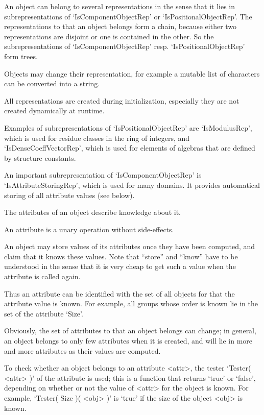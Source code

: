 An object can belong to several representations in the sense that it lies
in subrepresentations of `IsComponentObjectRep' or
`IsPositionalObjectRep'.
The representations to that an object belongs form a chain, 
because either two representations are disjoint or one is contained in
the other.
So the subrepresentations of `IsComponentObjectRep' resp.
`IsPositionalObjectRep' form trees.

Objects may change their representation,
for example a mutable list of characters can be converted into a string.

All representations are created during initialization,
especially they are not created dynamically at runtime.

Examples of subrepresentations of `IsPositionalObjectRep' are
`IsModulusRep',
which is used for residue classes in the ring of integers,
and `IsDenseCoeffVectorRep',
which is used for elements of algebras that are defined by structure
constants.

An important subrepresentation of `IsComponentObjectRep' is
`IsAttributeStoringRep', which is used for many domains.
It provides automatical storing of all attribute values (see below).


The attributes of an object describe knowledge about it.

An attribute is a unary operation without side-effects.

An object may store values of its attributes once they have been
computed, and claim that it knows these values.
Note that ``store'' and ``know'' have to be understood in the sense that 
it is very cheap to get such a value when the attribute is called again.


Thus an attribute can be identified with the set of all objects for that
the attribute value is known.
For example, all groups whose order is known lie in the set of the
attribute `Size'.

Obviously, the set of attributes to that an object belongs can change;
in general, an object belongs to only few attributes when it is created,
and will lie in more and more attributes as their values are computed.

To check whether an object belongs to an attribute <attr>,
the tester `Tester( <attr> )' of the attribute is used;
this is a function that returns `true' or `false',
depending on whether or not the value of <attr> for the object is known.
For example, `Tester( Size )( <obj> )' is `true' if the size of the object
<obj> is known.

